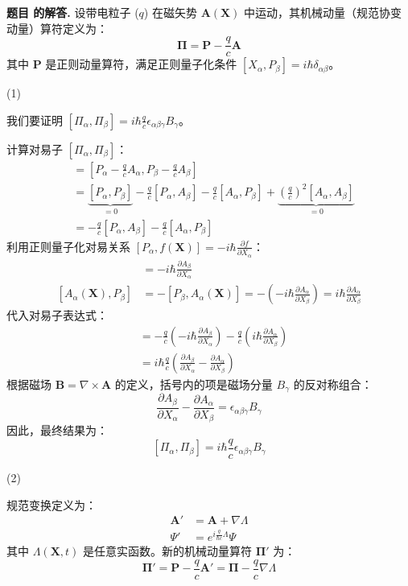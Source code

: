 \documentclass[12pt, a4paper, oneside]{ctexart}
\newcounter{problemname}
\newenvironment{solution}
  {\par\noindent\textbf{题目 \theproblemname 的解答. }}
  {\par}
\begin{document}
\begin{solution}
  设带电粒子 ($q$) 在磁矢势 $\mathbf{A}(\mathbf{X})$ 中运动，其机械动量（规范协变动量）算符定义为：
$$
\boldsymbol{\Pi} = \mathbf{P} - \frac{q}{c} \mathbf{A}
$$
其中 $\mathbf{P}$ 是正则动量算符，满足正则量子化条件 $[X_\alpha, P_\beta] = i\hbar \delta_{\alpha\beta}$。

(1)

我们要证明 $[\Pi_\alpha, \Pi_\beta] = i \hbar \frac{q}{c} \epsilon_{\alpha\beta\gamma} B_\gamma$。


计算对易子 $[\Pi_\alpha, \Pi_\beta]$：
\begin{align*}
[\Pi_\alpha, \Pi_\beta] &= \left[ P_\alpha - \frac{q}{c} A_\alpha, P_\beta - \frac{q}{c} A_\beta \right] \\
&= \underbrace{[P_\alpha, P_\beta]}_{=0} - \frac{q}{c} [P_\alpha, A_\beta] - \frac{q}{c} [A_\alpha, P_\beta] + \underbrace{\left(\frac{q}{c}\right)^2 [A_\alpha, A_\beta]}_{=0} \\
&= -\frac{q}{c} [P_\alpha, A_\beta] - \frac{q}{c} [A_\alpha, P_\beta]
\end{align*}
利用正则量子化对易关系 $[P_\alpha, f(\mathbf{X})] = -i\hbar \frac{\partial f}{\partial X_\alpha}$：
\begin{align*}
[P_\alpha, A_\beta(\mathbf{X})] &= -i\hbar \frac{\partial A_\beta}{\partial X_\alpha} \\
[A_\alpha(\mathbf{X}), P_\beta] &= -[P_\beta, A_\alpha(\mathbf{X})] = - \left( -i\hbar \frac{\partial A_\alpha}{\partial X_\beta} \right) = i\hbar \frac{\partial A_\alpha}{\partial X_\beta}
\end{align*}
代入对易子表达式：
\begin{align*}
[\Pi_\alpha, \Pi_\beta] &= -\frac{q}{c} \left( -i\hbar \frac{\partial A_\beta}{\partial X_\alpha} \right) - \frac{q}{c} \left( i\hbar \frac{\partial A_\alpha}{\partial X_\beta} \right) \\
&= i\hbar \frac{q}{c} \left( \frac{\partial A_\beta}{\partial X_\alpha} - \frac{\partial A_\alpha}{\partial X_\beta} \right)
\end{align*}
根据磁场 $\mathbf{B} = \nabla \times \mathbf{A}$ 的定义，括号内的项是磁场分量 $B_\gamma$ 的反对称组合：
$$
\frac{\partial A_\beta}{\partial X_\alpha} - \frac{\partial A_\alpha}{\partial X_\beta} = \epsilon_{\alpha\beta\gamma} B_\gamma
$$
因此，最终结果为：
$$
[\Pi_\alpha, \Pi_\beta] = i \hbar \frac{q}{c} \epsilon_{\alpha\beta\gamma} B_\gamma
$$


(2)

规范变换定义为：
\begin{align*}
\mathbf{A}' &= \mathbf{A} + \nabla \Lambda \\
\Psi' &= e^{i \frac{q}{\hbar c} \Lambda} \Psi
\end{align*}
其中 $\Lambda(\mathbf{X}, t)$ 是任意实函数。新的机械动量算符 $\boldsymbol{\Pi}'$ 为：
$$
\boldsymbol{\Pi}' = \mathbf{P} - \frac{q}{c} \mathbf{A}' = \boldsymbol{\Pi} - \frac{q}{c} \nabla \Lambda
$$



\end{solution}
\end{document}
